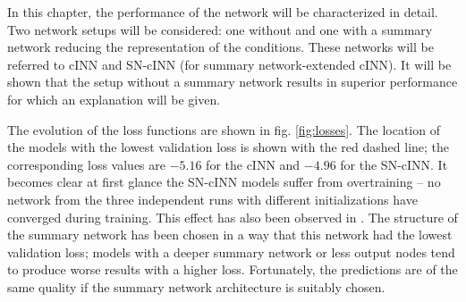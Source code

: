 
In this chapter, the performance of the network will be characterized in detail. Two network setups will be considered: one without and one with a summary network reducing the representation of the conditions. These networks will be referred to cINN and SN-cINN (for summary network-extended cINN). It will be shown that the setup without a summary network results in superior performance for which an explanation will be given. 


The evolution of the loss functions are shown in fig. \ref{fig:losses}. The location of the models with the lowest validation loss is shown with the red dashed line; the corresponding loss values are $-5.16$ for the cINN and $-4.96$ for the SN-cINN. It becomes clear at first glance the SN-cINN models suffer from overtraining -- no network from the three independent runs with different initializations have converged during training. This effect has also been observed in \cite{Ksoll_2020}. The structure of the summary network has been chosen in a way that this network had the lowest validation loss; models with a deeper summary network or less output nodes tend to produce worse results with a higher loss. Fortunately, the predictions are of the same quality if the summary network architecture is suitably chosen.

